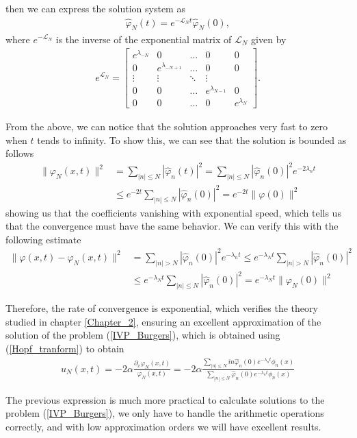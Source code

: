 	\noindent then we can express the solution system as 
	\begin{align*}
		\hat{\varphi}_N (t) =  e^{- \mathcal{L}_N t} \hat{\varphi}_N (0), 
	\end{align*}
	where $e^{- \mathcal{L}_N}$ is the inverse of the exponential matrix of $\mathcal{L}_N$ given by 
	\begin{align*}
		\displaystyle e^{\mathcal{L}_N} = {\begin{bmatrix}
				e^{\lambda_{-N}} & 0 & \ldots & 0 & 0\\
				0 & e^{\lambda_{-N + 1}} & \ldots & 0 & 0\\
				\vdots & \vdots & \ddots & \vdots \\
				0 & 0 & \ldots & e^{ \lambda_{N - 1}} & 0\\
				0 & 0 & \ldots & 0 & e^{\lambda_{N}}
		\end{bmatrix}}.
	\end{align*}
	
	From the above, we can notice that the solution approaches very fast to zero when $ t $ tends to infinity. To show this, we can see that the solution is bounded as follows
	\begin{align*}
		\| \varphi_N (x, t) \|^2 &= \displaystyle \sum_{ |n| \leq N} | \hat{\varphi}_n (t) |^2 = \sum_{ |n| \leq N} | \hat{\varphi}_n (0) |^2 e^{-2 \lambda_n t} \\
		&\leq e^{- 2 t} \sum_{ |n| \leq N} | \hat{\varphi}_n (0) |^2 = e^{- 2t} \| \varphi (0) \|^2 
	\end{align*}
	showing us that the coefficients vanishing with exponential speed, which tells us that the convergence must have the same behavior. We can verify this with the following estimate
	\begin{align*}
		\| \varphi(x, t) - \varphi_N (x, t) \|^2 &= \displaystyle \sum_{ |n| > N} | \hat{\varphi}_n (0) |^2 e^{-\lambda_n t} \leq e^{-\lambda_N t} \sum_{ |n| > N} | \hat{\varphi}_n (0) |^2 \\
		&\leq e^{-\lambda_N t} \sum_{ |n| \leq N} | \hat{\varphi}_n (0) |^2 = e^{-\lambda_N t} \|\varphi_N (0) \|^2 
	\end{align*}
	
	Therefore, the rate of convergence is exponential, which verifies the theory studied in chapter \ref{Chapter_2}, ensuring an excellent approximation of the solution of the problem (\ref{IVP_Burgers}), which is obtained using (\ref{Hopf_tranform}) to obtain
	\begin{align}
	\label{Exact_Solution_Approximation}	
		u_N (x, t)  = - 2 \alpha \frac{\partial_x \varphi_N (x, t)}{ \varphi_N (x, t)} = - 2 \alpha \frac{\displaystyle \sum_{ |n| \leq N} in \hat{\varphi}_n (0) e^{- \lambda_n t}  \phi_n (x) }{\displaystyle \sum_{|n| \leq N} \hat{\varphi}_n (0) e^{- \lambda_n t}  \phi_n (x)}
	\end{align}

	The previous expression is much more practical to calculate solutions to the problem (\ref{IVP_Burgers}), we only have to handle the arithmetic operations correctly, and with low approximation orders we will have excellent results.